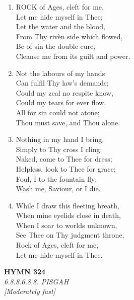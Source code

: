 \documentclass[11pt,a4paper]{article}
\begin{document}
\begin{enumerate}
    \item ROCK of Ages, cleft for me, \\
        Let me hide myself in Thee; \\
        Let the water and the blood, \\
        From Thy riv\`en side which flowed, \\
        Be of sin the double cure, \\
        Cleanse me from its guilt and power.

    \item Not the labours of my hands \\
        Can fulfil Thy law's demands; \\
        Could my zeal no respite know, \\
        Could my tears for ever flow, \\
        All for sin could not atone; \\
        Thou must save, and Thou alone.

    \item Nothing in my hand I bring, \\
        Simply to Thy cross I cling; \\
        Naked, come to Thee for dress; \\
        Helpless, look to Thee for grace; \\
        Foul, I to the fountain fly; \\
        Wash me, Saviour, or I die.

    \item While I draw this fleeting breath, \\
        When mine eyelids close in death, \\
        When I soar to worlds unknown, \\
        See Thee on Thy judgment throne, \\
        Rock of Ages, cleft for me, \\
        Let me hide myself in Thee.

\end{enumerate}

\newpage
\begin{center}
    {\Large \textbf{HYMN 324}}
    \\
    \textit{6.8.8.6.8.8. PISGAH}
    \\
    \textit{\small [Moderately fast]}
\end{center}
\vspace{1em}
\end{document}
